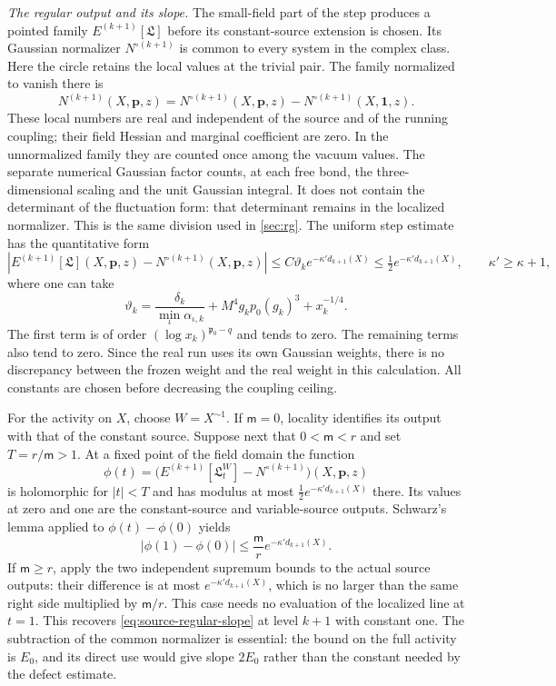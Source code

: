 \documentclass[11pt,letterpaper,reqno]{amsart}
\theoremstyle{definition}
\theoremstyle{remark}
\begin{document}
\emph{The regular output and its slope.}
The small-field part of the step produces a pointed family
$E^{(k+1)}[\mathfrak L]$ before its constant-source extension
is chosen. Its Gaussian normalizer $N^{\circ(k+1)}$ is common
to every system in the complex class. Here the circle retains
the local values at the trivial pair. The family normalized to
vanish there is
\[
 N^{(k+1)}(X,\mathbf p,z)
 =N^{\circ(k+1)}(X,\mathbf p,z)
                     -N^{\circ(k+1)}(X,\mathbf1,z).
\]
These local numbers are real and independent of the source and
of the running coupling; their field Hessian and marginal
coefficient are zero. In the unnormalized family they are
counted once among the vacuum values. The separate numerical
Gaussian factor counts, at each free bond, the three-dimensional
scaling and the unit Gaussian integral. It does not contain
the determinant of the fluctuation form: that determinant
remains in the localized normalizer. This is the same division
used in \cref{sec:rg}.
The uniform step estimate
has the quantitative form
\begin{equation}\label{eq:source-box-half-bound}
 \left|E^{(k+1)}[\mathfrak L](X,\mathbf p,z)
                     -N^{\circ(k+1)}(X,\mathbf p,z)\right|
 \le C\vartheta_k e^{-\kappa' d_{k+1}(X)}
 \le\tfrac12 e^{-\kappa'd_{k+1}(X)},
 \qquad \kappa'\ge\kappa+1,
\end{equation}
where one can take
\[
 \vartheta_k=
 \frac{\delta_k}{\min_\iota\alpha_{\iota,k}}
             +M^4g_kp_0(g_k)^3+x_k^{-1/4}.
\]
The first term is of order
$(\log x_k)^{\mathfrak p_0-q}$ and tends to zero.
The remaining terms also tend to zero. Since the real run uses
its own Gaussian weights, there is no discrepancy between the
frozen weight and the real weight in this calculation. All
constants are chosen before decreasing the coupling ceiling.

For the activity on $X$, choose $W=X^{\sim1}$.
If $\mathsf m=0$, locality identifies its output with that of the
constant source. Suppose next that $0<\mathsf m<r$ and set
$T=r/\mathsf m>1$. At a fixed point of the field domain the function
\[
 \phi(t)=
 \big(E^{(k+1)}[\mathfrak L_t^W]-N^{\circ(k+1)}\big)
                                      (X,\mathbf p,z)
\]
is holomorphic for $|t|<T$ and has modulus at most
$\frac12e^{-\kappa'd_{k+1}(X)}$ there. Its values at zero and
one are the constant-source and variable-source outputs. Schwarz's
lemma applied to $\phi(t)-\phi(0)$ yields
\[
 |\phi(1)-\phi(0)|
  \le\frac{\mathsf m}r e^{-\kappa'd_{k+1}(X)}.
\]
If $\mathsf m\ge r$, apply the two independent supremum bounds
to the actual source outputs: their difference is at most
$e^{-\kappa'd_{k+1}(X)}$, which is no larger than the same right
side multiplied by $\mathsf m/r$. This case needs no evaluation
of the localized line at $t=1$.
This recovers \eqref{eq:source-regular-slope} at level
$k+1$ with constant one. The subtraction of the common normalizer
is essential: the bound on the full activity is $E_0$, and its
direct use would give slope $2E_0$ rather than the constant needed
by the defect estimate.
\end{document}
